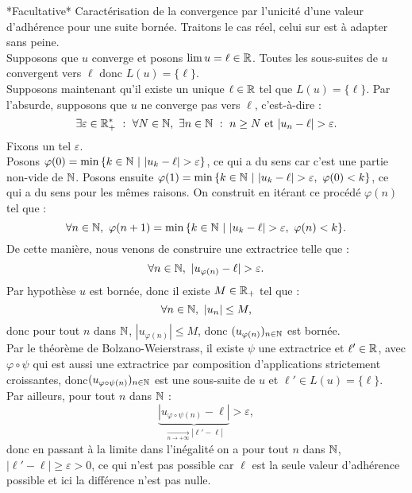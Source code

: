 \documentclass{article}
\begin{document}
	\begin{question_kholle}
	    {*Facultative* Caractérisation de la convergence par l'unicité d'une valeur d'adhérence pour une suite bornée.}
	    Traitons le cas réel, celui sur \C est à adapter sans peine.\\
	    Supposons que $u$ converge et posons $\lim u =\ell \in \mathbb R  $. Toutes les sous-suites de $u$ convergent vers $\ell$ donc $L(u)=\{\ell \}$. \\
	    Supposons maintenant qu'il existe un unique $\ell \in \mathbb R$ tel que $L(u) = \{ \ell \}$. Par l'absurde, supposons que $u$ ne converge pas vers $\ell$, c'est-à-dire : 
	    \[
	    \exists \varepsilon \in \mathbb R ^* _+ \ : \ \forall N \in \mathbb N, \ \exists n \in \mathbb N \ : \ n\geq N \text{ et } |u_n - \ell | > \varepsilon.
	    \]
	    Fixons un tel $\varepsilon$. \\
	    Posons $\varphi (0) = \min{ \{ k\in \N \ | \ |u_k - \ell| > \varepsilon \} }$, ce qui a du sens car c'est une partie non-vide de $\mathbb N$. Posons ensuite $\varphi (1) = \min{ \{ k\in \N \ | \ |u_k - \ell| > \varepsilon, \ \varphi(0) < k \} } $, ce qui a du sens pour les mêmes raisons. On construit en itérant ce procédé $\varphi (n)$ tel que : 
	    \[
	    \forall n \in \mathbb N, \ \varphi(n+1) = \min{ \{ k\in \ensuremath{\mathbb N} \ | \ |u_k - \ell| > \varepsilon, \ \varphi(n) < k \} }.
	    \]
	    De cette manière, nous venons de construire une extractrice telle que : 
	    \[
	    \forall n \in \N, \ |u_{\varphi(n)} - \ell| > \varepsilon.
	    \]
	    Par hypothèse $u$ est bornée, donc il existe $M\in \mathbb R _+$ tel que : 
	    \[
	    \forall n \in \mathbb N, \ |u_n| \leq M,
	    \]
	    donc pour tout $n$ dans $\mathbb N$, $|u_{\varphi(n)}| \leq M$, donc $(u_{\varphi(n)})_{n\in \mathbb N}$ est bornée. \\
	    Par le théorème de Bolzano-Weierstrass, il existe $\psi$ une extractrice et $\ell ' \in \mathbb R$, avec $\varphi \circ \psi$ qui est aussi une extractrice par composition d'applications strictement croissantes, donc$(u_{\varphi \circ \psi (n)})_{n\in \mathbb N}$ est une sous-suite de $u$ et $\ell ' \in L(u) = \{ \ell \}$.\\
	    Par ailleurs, pour tout $n$ dans $\mathbb N$ :
	    \[
	    \underset{\xrightarrow[n\to +\infty]{}|\ell' -\ell|}{\underbrace{|u_{\varphi \circ \psi (n)} - \ell|}} > \varepsilon,
	    \]
	    donc en passant à la limite dans l'inégalité on a pour tout $n$ dans $\mathbb N$, $|\ell ' - \ell | \geq \varepsilon > 0$, ce qui n'est pas possible car $\ell$ est la seule valeur d'adhérence possible et ici la différence n'est pas nulle.
	\end{question_kholle}
\end{document}

